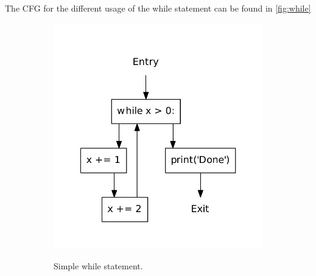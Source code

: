 The CFG for the different usage of the while statement can be found in \cref{fig:while}
\begin{figure}
  \centering
  \begin{subfigure}[b]{.4\textwidth}
    \includegraphics[scale=.5]{./figures/while_no_orelse.pdf}
    \label{fig:while:while_no_orelse}    
    \caption{Simple while statement.}
  \end{subfigure}
  ~
  \begin{subfigure}[b]{.4\textwidth}

\end{subfigure}
\end{figure}
